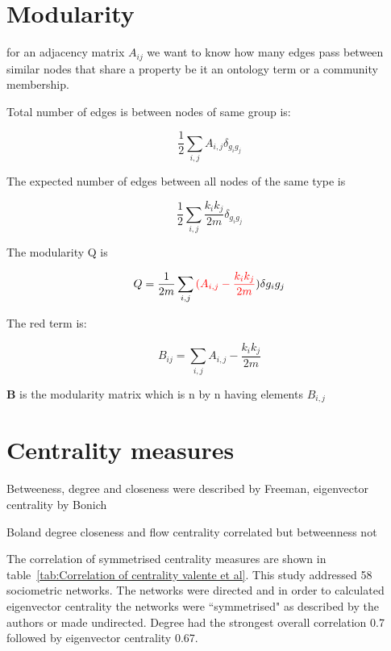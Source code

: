 \section{Modularity}

for an adjacency matrix $A_{ij}$ we want to know how many edges pass between similar nodes that share a property be it an ontology term or a community membership.

Total number of edges is between nodes of same group is:

\begin{equation}
\label{eq:notes_modularity_totaledges}
    \frac{1}{2} \sum_{i,j} A_{i,j}\delta_{g_i g_j}
\end{equation}

The expected number of edges between all nodes of the same type is 

\begin{equation}
    \frac{1}{2}\sum_{i,j} \frac{k_i k_j}{2m}\delta_{g_i g_j}
\end{equation}

The modularity Q is 

\begin{equation}
    Q=\frac{1}{2m}\sum_{i,j}\textcolor{red}{(A_{i,j}-\frac{k_i k_j}{2m}}) \delta{g_i g_j}
\end{equation}

The red term is:

\begin{equation}
    B_{ij} = \sum_{i,j} A_{i,j} - \frac{k_i k_j}{2m}
\end{equation}

$\mathbf{B}$ is the modularity matrix which is n by n having elements $B_{i,j}$



\section{Centrality measures}
Betweeness, degree and closeness were described by Freeman, eigenvector centrality by Bonich \cite{valente2008correlated}

Boland degree closeness and flow centrality correlated but betweenness not

The correlation of symmetrised centrality measures are shown in table~\ref{tab:Correlation of centrality valente et al}. This study addressed 58 sociometric networks. The networks were directed and in order to calculated eigenvector centrality the networks were ``symmetrised" as described by the authors or made undirected. Degree had the strongest overall correlation 0.7 followed by eigenvector centrality 0.67.




